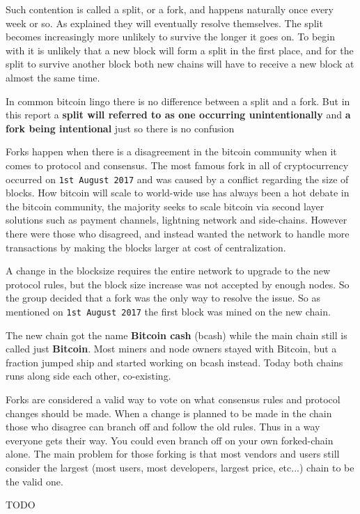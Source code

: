Such contention is called a split, or a fork, and happens naturally once every week or so. As explained they will eventually resolve themselves. The split becomes increasingly more unlikely to survive the longer it goes on. To begin with it is unlikely that a new block will form a split in the first place, and for the split to survive another block both new chains will have to receive a new block at almost the same time.

In common bitcoin lingo there is no difference between a split and a fork. But in this report a \textbf{split will referred to as one occurring unintentionally} and \textbf{a fork being intentional} just so there is no confusion

Forks happen when there is a disagreement in the bitcoin community when it comes to protocol and consensus. The most famous fork in all of cryptocurrency occurred on \texttt{1st August 2017} and was caused by a conflict regarding the size of blocks. How bitcoin will scale to world-wide use has always been a hot debate in the bitcoin community, the majority seeks to scale bitcoin via second layer solutions such as payment channels, lightning network and side-chains. However there were those who disagreed, and instead wanted the network to handle more transactions by making the blocks larger at cost of centralization. 

A change in the blocksize requires the entire network to upgrade to the new protocol rules, but the block size increase was not accepted by enough nodes. So the group decided that a fork was the only way to resolve the issue. So as mentioned on \texttt{1st August 2017} the first block was mined on the new chain. 

The new chain got the name \textbf{Bitcoin cash} (bcash) while the main chain still is called just \textbf{Bitcoin}. Most miners and node owners stayed with Bitcoin, but a fraction jumped ship and started working on bcash instead. Today both chains runs along side each other, co-existing.

Forks are considered a valid way to vote on what consensus rules and protocol changes should be made. When a change is planned to be made in the chain those who disagree can branch off and follow the old rules. Thus in a way everyone gets their way. You could even branch off on your own forked-chain alone. The main problem for those forking is that most vendors and users still consider the largest (most users, most developers, largest price, etc...) chain to be the valid one. 

\label{soft_hard_fork}
TODO